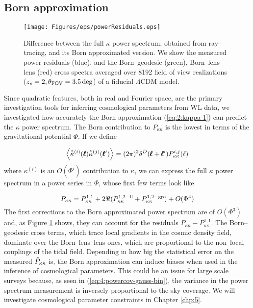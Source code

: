 \subsection{Born approximation}
\label{sec:4:bornpower}
%
\begin{figure}
\begin{center}
\texttt{[image: Figures/eps/powerResiduals.eps]}
\end{center}
\caption{Difference between the full $\kappa$ power spectrum, obtained from ray--tracing, and its Born approximated version. We show the measured power residuals (blue), and the Born--geodesic (green), Born--lens--lens (red) cross spectra averaged over 8192 field of view realizations ($z_s=2, \theta_{\rm FOV}=3.5\,{\rm deg}$) of a fiducial $\Lambda$CDM model.}
\label{fig:4:powerRes}
\end{figure}
%
Since quadratic features, both in real and Fourier space, are the primary investigation tools for inferring cosmological parameters from WL data, we investigated how accurately the Born approximation (\ref{eq:2:kappa-1}) can predict the $\kappa$ power spectrum. The Born contribution to $P_{\kappa\kappa}$ is the lowest in terms of the gravitational potential $\Phi$. If we define 

\begin{equation}
\label{eq:4:power-cross}
\left\langle\hat{\tilde{\kappa}}^{(i)}(\pmb{\ell})\hat{\tilde{\kappa}}^{(j)}(\pmb{\ell}')\right\rangle = (2\pi)^2\delta^D(\pmb{\ell}+\pmb{\ell}')P^{i,j}_{\kappa\kappa}(\ell)
\end{equation}
%
where $\kappa^{(i)}$ is an $O(\Phi^i)$ contribution to $\kappa$, we can express the full $\kappa$ power spectrum in a power series in $\Phi$, whose first few terms look like 

\begin{equation}
\label{eq:4:power-pert}
P_{\kappa\kappa} = P_{\kappa\kappa}^{1,1} + 2\Re (P^{1,2-{\rm ll}}_{\kappa\kappa}+P^{1,2-{\rm gp}}_{\kappa\kappa}) + O(\Phi^4) 
\end{equation}
%
The first corrections to the Born approximated power spectrum are of $O(\Phi^3)$ and, as Figure \ref{fig:4:powerRes} shows, they can account for the residuals $P_{\kappa\kappa}-P^{1,1}_{\kappa\kappa}$. The Born--geodesic cross terms, which trace local gradients in the cosmic density field, dominate over the Born--lens--lens ones, which are proportional to the non--local couplings of the tidal field. Depending in how big the statistical error on the measured $\hat{P}_{\kappa\kappa}$ is, the Born approximation can induce biases when used in the inference of cosmological parameters. This could be an issue for large scale surveys because, as seen in (\ref{eq:4:powercov-gauss-bin}), the variance in the power spectrum measurement is inversely proportional to the sky coverage. We will investigate cosmological parameter constraints in Chapter \ref{chp:5}.    

